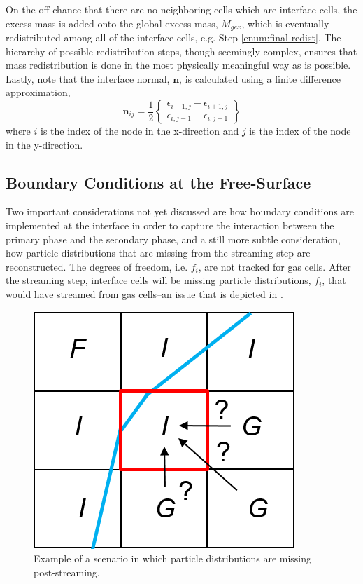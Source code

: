 \documentclass[pdftex,ms]{pittetd}
\begin{document}
On the off-chance that there are no neighboring cells which are interface cells, the excess mass is added onto the global excess mass, $M_{gex}$, which is eventually redistributed among all of the interface cells, e.g. Step \ref{enum:final-redist}.
The hierarchy of possible redistribution steps, though seemingly complex, ensures that mass redistribution is done in the most physically meaningful way as is possible. %
Lastly, note that the interface normal, $\mathbf{n}$, is calculated using a finite difference approximation,
\begin{equation} \label{eq:n}
\mathbf{n}_{ij} = \frac{1}{2} \begin{Bmatrix}
\epsilon_{i-1, j} - \epsilon_{i+1, j} \\
\epsilon_{i, j-1} - \epsilon_{i, j+1}
\end{Bmatrix}
\end{equation}
\noindent where $i$ is the index of the node in the x-direction and $j$ is the index of the node in the y-direction.

\subsection{Boundary Conditions at the Free-Surface} \label{sec:bc-at-fs}

Two important considerations not yet discussed are how boundary conditions are implemented at the interface in order to capture the interaction between the primary phase and the secondary phase, and a still more subtle consideration, how particle distributions that are missing from the streaming step are reconstructed.
The degrees of freedom, i.e. $f_i$, are not tracked for gas cells.
After the streaming step, interface cells will be missing particle distributions, $f_i$, that would have streamed from gas cells--an issue that is depicted in .

\begin{figure}
\centering
\includegraphics{figs/ps}
\caption{Example of a scenario in which particle distributions are missing post-streaming.}
\label{fig:ps}
\end{figure}
\end{document}

